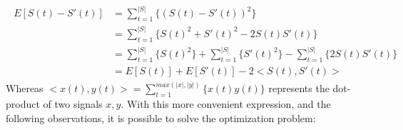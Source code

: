 \documentclass[11pt]{scrartcl} %
\begin{document}
  \begin{align*}
    \begin{aligned}
      E[S{\scriptstyle (t)}-S'{\scriptstyle (t)}] &= \sum_{t=1}^{|S|}\{(S{\scriptstyle (t)}-S'{\scriptstyle (t)})^2\}\\ %
      &= \sum_{t=1}^{|S|}\{S{\scriptstyle (t)}^2+S'{\scriptstyle (t)}^2-2S{\scriptstyle (t)}S'{\scriptstyle (t)}\}\\
      &= \sum_{t=1}^{|S|}\{S{\scriptstyle (t)}^2\}+\sum_{t=1}^{|S|}\{S'{\scriptstyle (t)}^2\}-\sum_{t=1}^{|S|}\{2S{\scriptstyle (t)}S'{\scriptstyle (t)}\}\\
      &= E[S{\scriptstyle (t)}] + E[S'{\scriptstyle (t)}] - 2<S{\scriptstyle (t)}, S'{\scriptstyle (t)}>
    \end{aligned}
  \end{align*}
  Whereas \(<x{\scriptstyle (t)},y{\scriptstyle (t)}> = \sum_{t=1}^{max(|x|,|y|)}\{x{\scriptstyle (t)}y{\scriptstyle (t)}\}\) represents the dot-product of two signals \(x, y\). With this more convenient expression, and the following observations, it is possible to solve the optimization problem:
\end{document}
